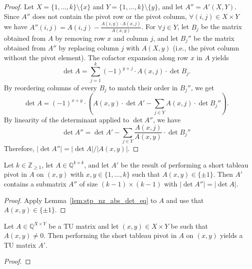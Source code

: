 \begin{proof}
    \leanok
    Let $X = \{1, \dots, k\} \setminus \{x\}$ and $Y = \{1, \dots, k\} \setminus \{y\}$, and let $A'' = A' (X, Y)$. Since $A''$ does not contain the pivot row or the pivot column, $\forall (i, j) \in X \times Y$ we have $A'' (i, j) = A (i, j) - \frac{A (i, y) \cdot A (x, j)}{A (x, y)}$. For $\forall j \in Y$, let $B_{j}$ be the matrix obtained from $A$ by removing row $x$ and column $j$, and let $B_{j}''$ be the matrix obtained from $A''$ by replacing column $j$ with $A (X, y)$ (i.e., the pivot column without the pivot element). The cofactor expansion along row $x$ in $A$ yields
    \[
        \det A = \sum_{j = 1}^{k} (-1)^{y + j} \cdot A (x, j) \cdot \det B_{j}.
    \]
    By reordering columns of every $B_{j}$ to match their order in $B_{j}''$, we get
    \[
        \det A = (-1)^{x + y} \cdot \left( A (x, y) \cdot \det A' - \sum_{j \in Y} A (x, j) \cdot \det B_{j}'' \right).
    \]
    By linearity of the determinant applied to $\det A''$, we have
    \[
        \det A'' = \det A' - \sum_{j \in Y} \frac{A (x, j)}{A (x, y)} \cdot \det B_{j}''
    \]
    Therefore, $|\det A''| = |\det A| / |A (x, y)|$.
\end{proof}

\begin{lemma}
    \label{lem:stp_pn_abs_det_eq}
    \leanok
    Let $k \in \mathbb{Z}_{\geq 1}$, let $A \in \mathbb{Q}^{k \times k}$, and let $A'$ be the result of performing a short tableau pivot in $A$ on $(x, y)$ with $x, y \in \{1, \dots, k\}$ such that $A (x, y) \in \{\pm 1\}$. Then $A'$ contains a submatrix $A''$ of size $(k - 1) \times (k - 1)$ with $|\det A''| = |\det A|$.
\end{lemma}

\begin{proof}
    \leanok
    Apply Lemma~\ref{lem:stp_nz_abs_det_eq} to $A$ and use that $A (x, y) \in \{\pm 1\}$.
\end{proof}

\begin{lemma}
    \label{lem:stp_tu}
    \leanok
    Let $A \in \mathbb{Q}^{X \times Y}$ be a TU matrix and let $(x, y) \in X \times Y$ be such that $A (x, y) \neq 0$. Then performing the short tableau pivot in $A$ on $(x, y)$ yields a TU matrix $A'$.
\end{lemma}

\begin{proof}
    \leanok
    \SeeLean
\end{proof}


